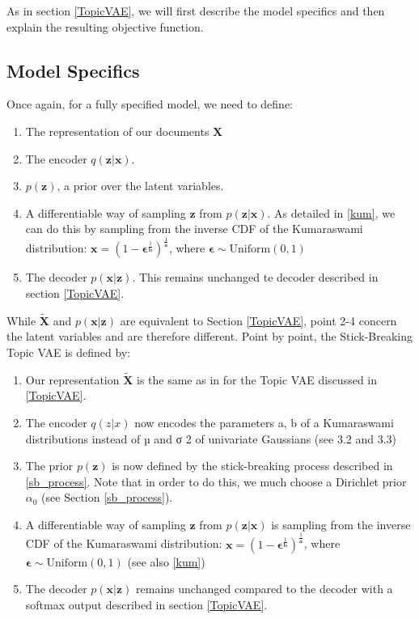 \documentclass{report}
\begin{document}
As in section \ref{TopicVAE}, we will first describe the model specifics and then explain the resulting objective function.
\subsection{Model Specifics}
Once again, for a fully specified model, we need to define:
\begin{enumerate}
	\item The representation of our documents $\mathbf{X}$
	\item The encoder $q(\mathbf{z}|\mathbf{x})$.
	\item $p(\mathbf{z})$, a prior  over the latent variables. 
	\item A differentiable way of sampling $\mathbf{z}$ from $p(\mathbf{z}|\mathbf{x})$. As detailed in \ref{kum}, we can do this by sampling from the inverse CDF of the Kumaraswami distribution: $\mathbf{x} = (1-\boldsymbol{\epsilon}^{\frac{1}{\mathbf{b}}})^{\frac{1}{\mathbf{a}}}$, where $\boldsymbol{\epsilon} \sim \text{Uniform}(0,1)$
	\item The decoder $p(\mathbf{x}|\mathbf{z})$. This remains unchanged te decoder described in section \ref{TopicVAE}.
\end{enumerate} \vspace{0.5cm}

While $\tilde{\mathbf{X}}$ and $p(\mathbf{x|z})$ are equivalent to Section \ref{TopicVAE}, point 2-4 concern the latent variables and are therefore different. Point by point, the Stick-Breaking Topic VAE is defined by: 
\vspace{0.5cm}

\begin{enumerate}
	\item Our representation  $\tilde{\mathbf{X}} $ is the same as in for the Topic VAE discussed in \ref{TopicVAE}.
	\item The encoder $q(z|x)$ now encodes the parameters {a, b} of a Kumaraswami distributions
	instead of µ and σ
	2 of univariate Gaussians (see 3.2 and 3.3)
	\item The prior $p(\mathbf{z})$ is now defined by the stick-breaking process described in \ref{sb_process}. Note that in order to do this, we much choose a Dirichlet prior $\alpha_0$ (see Section \ref{sb_process}).
	\item A differentiable way of sampling $\mathbf{z}$ from $p(\mathbf{z}|\mathbf{x})$ is sampling from the inverse CDF of the Kumaraswami distribution: $\mathbf{x} = (1-\boldsymbol{\epsilon}^{\frac{1}{\mathbf{b}}})^{\frac{1}{\mathbf{a}}}$, where $\boldsymbol{\epsilon} \sim \text{Uniform}(0,1)$ (see also \ref{kum})
	\item The decoder $p(\mathbf{x}|\mathbf{z})$ remains unchanged compared to the decoder with a softmax output described in section \ref{TopicVAE}.
\end{enumerate}
\end{document}
